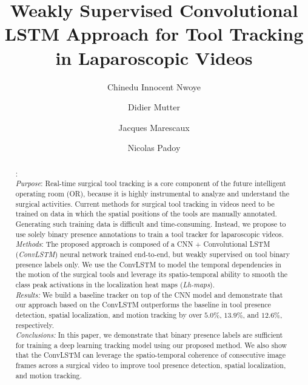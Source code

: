 \documentclass{svjour3}                     \smartqed
\begin{document}
\title{Weakly Supervised Convolutional LSTM Approach for Tool Tracking in Laparoscopic Videos}\subtitle{}
 \author{Chinedu Innocent Nwoye        \and
        Didier Mutter  \and
        Jacques Marescaux  \and
        Nicolas Padoy
}
\date{
} 

\maketitle

\begin{abstract}:\\ 
\emph{Purpose}: Real-time surgical tool tracking is a core component of the future intelligent operating room (OR), because it is highly instrumental to analyze and understand the surgical activities. 
Current methods for surgical tool tracking in videos need to be trained on data in which the spatial positions of the tools are manually annotated. Generating such training data is difficult and time-consuming. Instead, we propose to use solely binary presence annotations to train a tool tracker for laparoscopic videos.\\
\emph{Methods}: The proposed approach is composed of a CNN + Convolutional LSTM (\emph{ConvLSTM}) neural network trained end-to-end, but weakly supervised on tool binary presence labels only. 
We use the ConvLSTM to model the temporal dependencies in the motion of the surgical tools and leverage its spatio-temporal ability to smooth the class peak activations in the localization heat maps (\emph{Lh-maps}).\\ 
\emph{Results:} We build a baseline tracker on top of the CNN model and demonstrate that our approach based on the ConvLSTM outperforms the baseline in tool presence detection, spatial localization, and motion tracking by over $5.0\%$, $13.9\%$, and $12.6\%$, respectively.\\ 
\emph{Conclusions:} In this paper, we demonstrate that binary presence labels are sufficient for training a deep learning tracking model using our proposed method. We also show that the ConvLSTM can leverage the spatio-temporal coherence of consecutive image frames across a surgical video to improve tool presence detection, spatial localization, and motion tracking.
\end{abstract}
\end{document}
